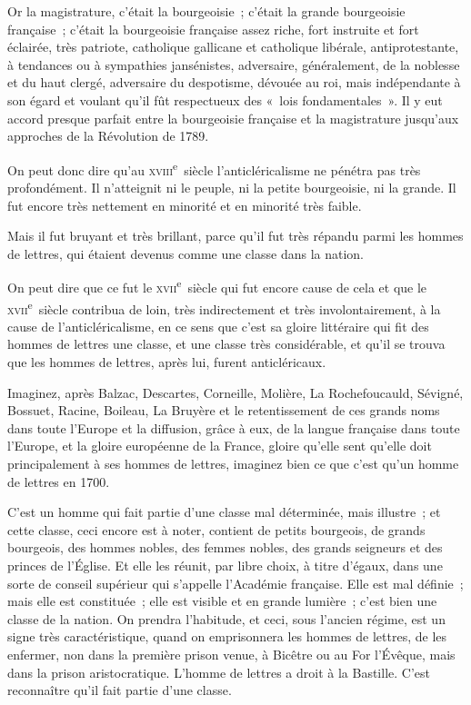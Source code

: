 \documentclass[french,twoside]{book} %
\begin{document}
Or la magistrature, c’était la bourgeoisie ; c’était la grande bourgeoisie française ; c’était la bourgeoisie  française assez riche, fort instruite et fort éclairée, très patriote, catholique gallicane et catholique libérale, antiprotestante, à tendances ou à sympathies jansénistes, adversaire, généralement, de la noblesse et du haut clergé, adversaire du despotisme, dévouée au roi, mais indépendante à son égard et voulant qu’il fût respectueux des « lois fondamentales ». Il y eut accord presque parfait entre la bourgeoisie française et la magistrature jusqu’aux approches de la Révolution de 1789.\par
On peut donc dire qu’au \textsc{xviii}\textsuperscript{e} siècle l’anticléricalisme ne pénétra pas très profondément. Il n’atteignit ni le peuple, ni la petite bourgeoisie, ni la grande. Il fut encore très nettement en minorité et en minorité très faible.\par
Mais il fut bruyant et très brillant, parce qu’il fut très répandu parmi les hommes de lettres, qui étaient devenus comme une classe dans la nation.\par
On peut dire que ce fut le \textsc{xvii}\textsuperscript{e} siècle qui fut encore cause de cela et que le \textsc{xvii}\textsuperscript{e} siècle contribua de loin, très indirectement et très involontairement, à la cause de l’anticléricalisme, en ce sens que c’est sa gloire littéraire qui fit des hommes de lettres une classe, et une classe très considérable, et qu’il se trouva que les hommes de lettres, après lui, furent anticléricaux.\par
 Imaginez, après Balzac, Descartes, Corneille, Molière, La Rochefoucauld, Sévigné, Bossuet, Racine, Boileau, La Bruyère et le retentissement de ces grands noms dans toute l’Europe et la diffusion, grâce à eux, de la langue française dans toute l’Europe, et la gloire européenne de la France, gloire qu’elle sent qu’elle doit principalement à ses hommes de lettres, imaginez bien ce que c’est qu’un homme de lettres en 1700.\par
C’est un homme qui fait partie d’une classe mal déterminée, mais illustre ; et cette classe, ceci encore est à noter, contient de petits bourgeois, de grands bourgeois, des hommes nobles, des femmes nobles, des grands seigneurs et des princes de l’Église. Et elle les réunit, par libre choix, à titre d’égaux, dans une sorte de conseil supérieur qui s’appelle l’Académie française. Elle est mal définie ; mais elle est constituée ; elle est visible et en grande lumière ; c’est bien une classe de la nation. On prendra l’habitude, et ceci, sous l’ancien régime, est un signe très caractéristique, quand on emprisonnera les hommes de lettres, de les enfermer, non dans la première prison venue, à Bicêtre ou au For l’Évêque, mais dans la prison aristocratique. L’homme de lettres a droit à la Bastille. C’est reconnaître qu’il fait partie d’une classe.\par
\end{document}
